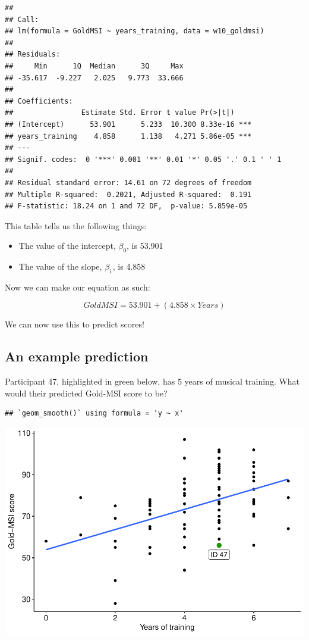 \documentclass[
]{book}
\providecommand{\tightlist}{%
  \setlength{\itemsep}{0pt}\setlength{\parskip}{0pt}}
\begin{document}
\begin{verbatim}
## 
## Call:
## lm(formula = GoldMSI ~ years_training, data = w10_goldmsi)
## 
## Residuals:
##     Min      1Q  Median      3Q     Max 
## -35.617  -9.227   2.025   9.773  33.666 
## 
## Coefficients:
##                Estimate Std. Error t value Pr(>|t|)    
## (Intercept)      53.901      5.233  10.300 8.33e-16 ***
## years_training    4.858      1.138   4.271 5.86e-05 ***
## ---
## Signif. codes:  0 '***' 0.001 '**' 0.01 '*' 0.05 '.' 0.1 ' ' 1
## 
## Residual standard error: 14.61 on 72 degrees of freedom
## Multiple R-squared:  0.2021, Adjusted R-squared:  0.191 
## F-statistic: 18.24 on 1 and 72 DF,  p-value: 5.859e-05
\end{verbatim}

This table tells us the following things:

\begin{itemize}
\tightlist
\item
  The value of the intercept, \(\beta_0\), is 53.901
\item
  The value of the slope, \(\beta_1\), is 4.858
\end{itemize}

Now we can make our equation as such:

\[
GoldMSI = 53.901 + (4.858 \times Years)
\]

We can now use this to predict scores!

\subsection{An example prediction}\label{an-example-prediction}

Participant 47, highlighted in green below, has 5 years of musical training. What would their predicted Gold-MSI score to be?

\begin{verbatim}
## `geom_smooth()` using formula = 'y ~ x'
\end{verbatim}

\includegraphics{_main_files/figure-latex/unnamed-chunk-218-1.pdf}
\end{document}
